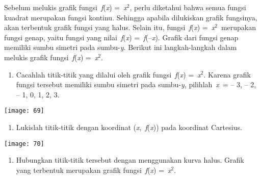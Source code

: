 \documentclass[11pt,fleqn]{book} %
\begin{document}
\noindent Sebelum melukis grafik fungsi~\textit{f}(\textit{x}) =~\textit{x}${}^{2}$, perlu diketahui bahwa semua fungsi kuadrat merupakan fungsi kontinu. Sehingga apabila dilukiskan grafik fungsinya, akan terbentuk grafik fungsi yang halus. Selain itu, fungsi~\textit{f}(\textit{x}) =~\textit{x}${}^{2}$~merupakan fungsi genap, yaitu fungsi yang nilai~\textit{f}(\textit{x}) =~\textit{f}(--\textit{x}). Grafik dari fungsi genap memiliki sumbu simetri pada sumbu-\textit{y}. Berikut ini langkah-langkah dalam melukis grafik fungsi~\textit{f}(\textit{x}) =~\textit{x}${}^{2}$.

\begin{enumerate}
\item  Cacahlah titik-titik yang dilalui oleh grafik fungsi~\textit{f}(\textit{x}) =~\textit{x}${}^{2}$. Karena grafik fungsi tersebut memiliki sumbu simetri pada sumbu-\textit{y}, pilihlah~\textit{x}~= -- 3, -- 2, -- 1, 0, 1, 2, 3.\textbf{}
\end{enumerate}

\begin{center}
\noindent \texttt{[image: 69]}\textbf{}
\end{center}

\noindent \textbf{}

\noindent \textbf{}

\noindent \textbf{}

\noindent \textbf{}

\noindent \textbf{}

\noindent \textbf{}

\noindent \textbf{}

\begin{enumerate}
\item \textbf{ }Lukislah titik-titik dengan koordinat (\textit{x},~\textit{f}(\textit{x})) pada koordinat Cartesius.\textbf{}
\end{enumerate}

\begin{center}
\noindent \texttt{[image: 70]}\textbf{}
\end{center}

\begin{enumerate}
\item \textbf{ }Hubungkan titik-titik tersebut dengan menggunakan kurva halus. Grafik yang terbentuk merupakan grafik fungsi~\textit{f}(\textit{x}) =~\textit{x}${}^{2}$.\textbf{}
\end{enumerate}
\end{document}

